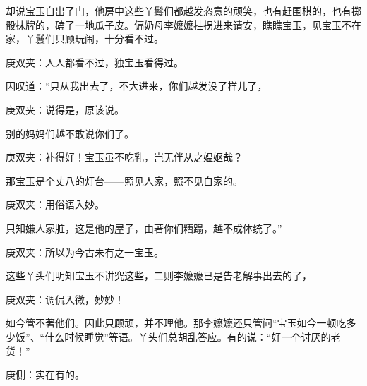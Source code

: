 \begin{parag}
    却说宝玉自出了门，他房中这些丫鬟们都越发恣意的顽笑，也有赶围棋的，也有掷骰抹牌的，磕了一地瓜子皮。偏奶母李嬷嬷拄拐进来请安，瞧瞧宝玉，见宝玉不在家，丫鬟们只顾玩闹，十分看不过。\begin{note}庚双夹：人人都看不过，独宝玉看得过。\end{note}因叹道：“只从我出去了，不大进来，你们越发没了样儿了，\begin{note}庚双夹：说得是，原该说。\end{note}别的妈妈们越不敢说你们了。\begin{note}庚双夹：补得好！宝玉虽不吃乳，岂无伴从之媪妪哉？\end{note}那宝玉是个丈八的灯台——照见人家，照不见自家的。\begin{note}庚双夹：用俗语入妙。\end{note}只知嫌人家脏，这是他的屋子，由著你们糟蹋，越不成体统了。”\begin{note}庚双夹：所以为今古未有之一宝玉。\end{note}这些丫头们明知宝玉不讲究这些，二则李嬷嬷已是告老解事出去的了，\begin{note}庚双夹：调侃入微，妙妙！\end{note}如今管不著他们。因此只顾顽，并不理他。那李嬷嬷还只管问“宝玉如今一顿吃多少饭”、“什么时候睡觉”等语。丫头们总胡乱答应。有的说：“好一个讨厌的老货！”\begin{note}庚侧：实在有的。\end{note}
\end{parag}


